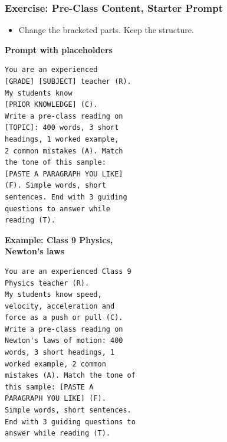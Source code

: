 \begin{frame}[fragile]\frametitle{Exercise: Pre-Class Content, Starter Prompt}
\begin{itemize}
\item Change the bracketed parts. Keep the structure.
\end{itemize}
\PairBegin
{\footnotesize\textbf{Prompt with placeholders}\\\mbox{}}
\begin{lstlisting}[language={},numbers=none]
You are an experienced
[GRADE] [SUBJECT] teacher (R).
My students know
[PRIOR KNOWLEDGE] (C).
Write a pre-class reading on
[TOPIC]: 400 words, 3 short
headings, 1 worked example,
2 common mistakes (A). Match
the tone of this sample:
[PASTE A PARAGRAPH YOU LIKE]
(F). Simple words, short
sentences. End with 3 guiding
questions to answer while
reading (T).
\end{lstlisting}
\PairMid
{\footnotesize\textbf{Example: Class 9 Physics,\\ Newton's laws}}
\begin{lstlisting}[language={},numbers=none]
You are an experienced Class 9
Physics teacher (R).
My students know speed,
velocity, acceleration and
force as a push or pull (C).
Write a pre-class reading on
Newton's laws of motion: 400
words, 3 short headings, 1
worked example, 2 common
mistakes (A). Match the tone of
this sample: [PASTE A
PARAGRAPH YOU LIKE] (F).
Simple words, short sentences.
End with 3 guiding questions to
answer while reading (T).
\end{lstlisting}
\PairEnd
\end{frame}

